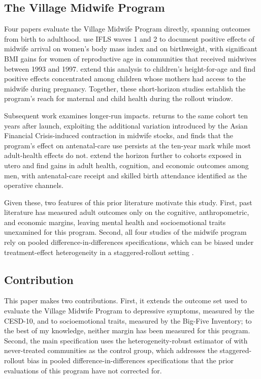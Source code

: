 \subsection{The Village Midwife Program}

Four papers evaluate the Village Midwife Program directly, spanning outcomes from birth to adulthood. \textcite{frankenbergthomas2001} use IFLS waves 1 and 2 to document positive effects of midwife arrival on women's body mass index and on birthweight, with significant BMI gains for women of reproductive age in communities that received midwives between 1993 and 1997. \textcite{frankenberg2005} extend this analysis to children's height-for-age and find positive effects concentrated among children whose mothers had access to the midwife during pregnancy. Together, these short-horizon studies establish the program's reach for maternal and child health during the rollout window.

Subsequent work examines longer-run impacts. \textcite{triyana2016} returns to the same cohort ten years after launch, exploiting the additional variation introduced by the Asian Financial Crisis-induced contraction in midwife stocks, and finds that the program's effect on antenatal-care use persists at the ten-year mark while most adult-health effects do not. \textcite{ahsan2021} extend the horizon further to cohorts exposed in utero and find gains in adult health, cognition, and economic outcomes among men, with antenatal-care receipt and skilled birth attendance identified as the operative channels.

Given these, two features of this prior literature motivate this study. First, past literature has measured adult outcomes only on the cognitive, anthropometric, and economic margins, leaving mental health and socioemotional traits unexamined for this program. Second, all four studies of the midwife program rely on pooled difference-in-differences specifications, which can be biased under treatment-effect heterogeneity in a staggered-rollout setting \autocite{goodmanbacon2021}.

\subsection{Contribution}

This paper makes two contributions. First, it extends the outcome set used to evaluate the Village Midwife Program to depressive symptoms, measured by the CESD-10, and to socioemotional traits, measured by the Big-Five Inventory; to the best of my knowledge, neither margin has been measured for this program. Second, the main specification uses the heterogeneity-robust estimator of \textcite{callawaysantanna2021} with never-treated communities as the control group, which addresses the staggered-rollout bias in pooled difference-in-differences specifications that the prior evaluations of this program have not corrected for.
